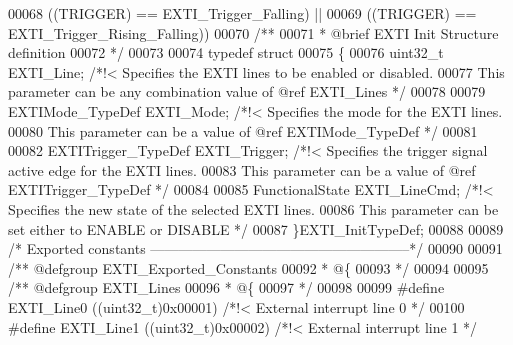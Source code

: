 \begin{DoxyCode}
00068                                   \textcolor{preprocessor}{(}\textcolor{preprocessor}{(}\textcolor{preprocessor}{TRIGGER}\textcolor{preprocessor}{)} \textcolor{preprocessor}{==} \textcolor{preprocessor}{EXTI\_Trigger\_Falling}\textcolor{preprocessor}{)} \textcolor{preprocessor}{||}
00069                                   \textcolor{preprocessor}{(}\textcolor{preprocessor}{(}\textcolor{preprocessor}{TRIGGER}\textcolor{preprocessor}{)} \textcolor{preprocessor}{==} \textcolor{preprocessor}{EXTI\_Trigger\_Rising\_Falling}\textcolor{preprocessor}{)}\textcolor{preprocessor}{)}
00070 \textcolor{comment}{/** }
00071 \textcolor{comment}{  * @brief  EXTI Init Structure definition  }
00072 \textcolor{comment}{  */}
00073 
00074 \textcolor{keyword}{typedef} \textcolor{keyword}{struct}
00075 \{
00076   uint32\_t EXTI_Line;               \textcolor{comment}{/*!< Specifies the EXTI lines to be enabled or disabled.}
00077 \textcolor{comment}{                                         This parameter can be any combination value of @ref
       EXTI\_Lines */}
00078 
00079   EXTIMode\_TypeDef EXTI_Mode;       \textcolor{comment}{/*!< Specifies the mode for the EXTI lines.}
00080 \textcolor{comment}{                                         This parameter can be a value of @ref EXTIMode\_TypeDef */}
00081 
00082   EXTITrigger\_TypeDef EXTI_Trigger; \textcolor{comment}{/*!< Specifies the trigger signal active edge for the EXTI lines.}
00083 \textcolor{comment}{                                         This parameter can be a value of @ref EXTITrigger\_TypeDef */}
00084 
00085   FunctionalState EXTI_LineCmd;     \textcolor{comment}{/*!< Specifies the new state of the selected EXTI lines.}
00086 \textcolor{comment}{                                         This parameter can be set either to ENABLE or DISABLE */}
00087 \}EXTI\_InitTypeDef;
00088 
00089 \textcolor{comment}{/* Exported constants --------------------------------------------------------*/}
00090 
00091 \textcolor{comment}{/** @defgroup EXTI\_Exported\_Constants}
00092 \textcolor{comment}{  * @\{}
00093 \textcolor{comment}{  */}
00094 
00095 \textcolor{comment}{/** @defgroup EXTI\_Lines }
00096 \textcolor{comment}{  * @\{}
00097 \textcolor{comment}{  */}
00098 
00099 \textcolor{preprocessor}{#}\textcolor{preprocessor}{define} \textcolor{preprocessor}{EXTI\_Line0}       \textcolor{preprocessor}{(}\textcolor{preprocessor}{(}\textcolor{preprocessor}{uint32\_t}\textcolor{preprocessor}{)}0x00001\textcolor{preprocessor}{)}     \textcolor{comment}{/*!< External interrupt line 0 */}
00100 \textcolor{preprocessor}{#}\textcolor{preprocessor}{define} \textcolor{preprocessor}{EXTI\_Line1}       \textcolor{preprocessor}{(}\textcolor{preprocessor}{(}\textcolor{preprocessor}{uint32\_t}\textcolor{preprocessor}{)}0x00002\textcolor{preprocessor}{)}     \textcolor{comment}{/*!< External interrupt line 1 */}

\end{DoxyCode}

